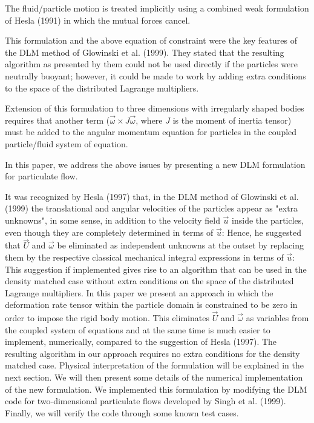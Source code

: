 \documentclass[10pt,a4paper]{article}
\begin{document}
The fluid/particle motion is treated implicitly using a combined weak formulation of Hesla (1991) in which the mutual forces cancel. 

This formulation and the above equation of constraint were the key features of the DLM method of Glowinski et al. (1999). They stated that the resulting algorithm as presented by them could not be used directly if the particles were neutrally buoyant; however, it could be made to work by adding extra conditions to the space of the distributed Lagrange multipliers.

Extension of this formulation to three dimensions with irregularly shaped bodies requires that another term ($\vec \omega \times J \vec \omega$, where $J$ is the moment of inertia tensor) must be added to the angular momentum equation for particles in the coupled particle/fluid system of equation. 

In this paper, we address the above issues by presenting a new DLM formulation for particulate flow. 

It was recognized by Hesla (1997) that, in the DLM method of Glowinski et al. (1999) the translational and angular velocities of the particles appear as "extra unknowns", in some sense, in addition to the velocity field $ \vec u$ inside the particles, even though they are completely determined in terms of $ \vec u$: Hence, he suggested that $ \vec U$ and $ \vec \omega$ be eliminated as independent unknowns at the outset by replacing them by the respective classical mechanical integral expressions in terms of $ \vec u$: This suggestion if implemented gives rise to an algorithm that can be used in the density matched case without extra conditions on the space of the distributed Lagrange multipliers. In this paper we present an approach in which the deformation rate tensor within the particle domain is constrained to be zero in order to impose the rigid body motion. This eliminates $ \vec U$ and $ \vec \omega$ as variables from the coupled system of equations and at the same time is much easier to implement, numerically, compared to the suggestion of Hesla (1997). The resulting algorithm in our approach requires no extra conditions for the density matched case. Physical interpretation of the formulation will be explained in the next section. We will then present some details of the numerical
implementation of the new formulation. We implemented this formulation by modifying the DLM code for two-dimensional particulate flows developed by Singh et al. (1999). Finally, we
will verify the code through some known test cases.
\end{document}
